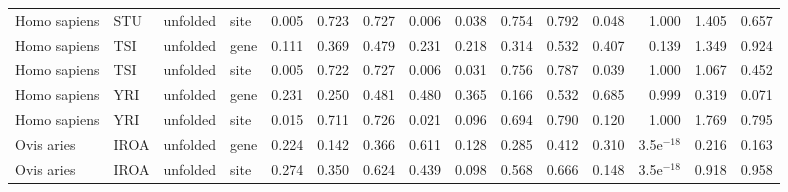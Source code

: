 \begin{longtable}{llllrrrrrrrrrrr}
        Homo sapiens &                       STU &  unfolded &  site &                              0.005 &                               0.723 &                 0.727 &                 0.006 &                              0.038 &                               0.754 &                 0.792 &                 0.048 &        1.000 &  1.405 &  0.657 \\
        Homo sapiens &                       TSI &  unfolded &  gene &                              0.111 &                               0.369 &                 0.479 &                 0.231 &                              0.218 &                               0.314 &                 0.532 &                 0.407 &        0.139 &  1.349 &  0.924 \\
        Homo sapiens &                       TSI &  unfolded &  site &                              0.005 &                               0.722 &                 0.727 &                 0.006 &                              0.031 &                               0.756 &                 0.787 &                 0.039 &        1.000 &  1.067 &  0.452 \\
        Homo sapiens &                       YRI &  unfolded &  gene &                              0.231 &                               0.250 &                 0.481 &                 0.480 &                              0.365 &                               0.166 &                 0.532 &                 0.685 &        0.999 &  0.319 &  0.071 \\
        Homo sapiens &                       YRI &  unfolded &  site &                              0.015 &                               0.711 &                 0.726 &                 0.021 &                              0.096 &                               0.694 &                 0.790 &                 0.120 &        1.000 &  1.769 &  0.795 \\
          Ovis aries &                      IROA &  unfolded &  gene &                              0.224 &                               0.142 &                 0.366 &                 0.611 &                              0.128 &                               0.285 &                 0.412 &                 0.310 & 3.5e$^{-18}$ &  0.216 &  0.163 \\
          Ovis aries &                      IROA &  unfolded &  site &                              0.274 &                               0.350 &                 0.624 &                 0.439 &                              0.098 &                               0.568 &                 0.666 &                 0.148 & 3.5e$^{-18}$ &  0.918 &  0.958 \\

\end{longtable}
